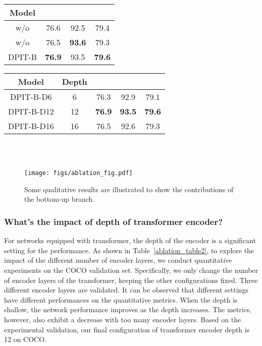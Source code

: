 \documentclass[runningheads]{llncs}
\begin{document}
\begin{minipage}[c]{0.5\textwidth}
\centering
{}
\label{ablation_table1}
\begin{tabular}{c|ccc}
  \toprule
  Model   &   &   &                \\
  \midrule
  \midrule
  w/o    & 76.6 & 92.5  & 79.4    \\
  w/o    & 76.5 & \textbf{93.6}  & 79.3    \\
  DPIT-B  & \textbf{76.9} & 93.5 & \textbf{79.6} \\
  \bottomrule
 \end{tabular}
\end{minipage}
\qquad
\begin{minipage}[c]{0.4\textwidth}
\centering
{}
\label{ablation_table2}
\begin{tabular}{c|c|ccc}
  \toprule
  Model   & Depth &  &   &  \\
  \midrule
  \midrule
  DPIT-B-D6  & 6  & 76.3 & 92.9 & 79.1    \\
  DPIT-B-D12 & 12 & \textbf{76.9} & \textbf{93.5} & \textbf{79.6}    \\
  DPIT-B-D16 & 16 & 76.5 & 92.6 & 79.3    \\
  \bottomrule
\end{tabular}
\end{minipage}
\\
\\
\begin{figure*}
  \centerline{\texttt{[image: figs/ablation\_fig.pdf]}}
  \caption{Some qualitative results are illustrated to show the contributions of the bottom-up branch.}
  \label{ablation_fig}
\end{figure*}
\subsubsection{What's the impact of depth of transformer encoder?}
For networks equipped with transformer, the depth of the encoder is a significant setting for the performance. As shown in Table~\ref{ablation_table2}, to explore the impact of the different number of encoder layers, we conduct quantitative experiments on the COCO validation set. Specifically, we only change the number of encoder layers of the transformer, keeping the other configurations fixed. Three different encoder layers are validated. It can be observed that different settings have different performances on the quantitative metrics. When the depth is shallow, the network performance improves as the depth increases. The metrics, however, also exhibit a decrease with too many encoder layers. Based on the
experimental validation, our final configuration of transformer encoder depth is 12 on COCO. 
\end{document}
